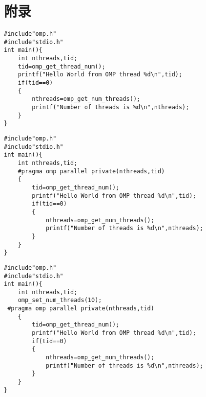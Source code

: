 \documentclass{article}
\begin{document}
\section{附录}
\noindent
\begin{minipage}[t]{0.45\textwidth}
\begin{lstlisting}[style=cstyle,caption={串行Helloworld}]
#include"omp.h"
#include"stdio.h"
int main(){
    int nthreads,tid;
    tid=omp_get_thread_num();
    printf("Hello World from OMP thread %d\n",tid);
    if(tid==0)
    {
        nthreads=omp_get_num_threads();
        printf("Number of threads is %d\n",nthreads);
    }
}
    \end{lstlisting}
\end{minipage}
\hfill 
\begin{minipage}[t]{0.45\textwidth}
    \begin{lstlisting}[style=cstyle,caption={不设线程并行Helloworld}]
#include"omp.h"
#include"stdio.h"
int main(){
    int nthreads,tid;
    #pragma omp parallel private(nthreads,tid)
    {
        tid=omp_get_thread_num();
        printf("Hello World from OMP thread %d\n",tid);
        if(tid==0)
        {
            nthreads=omp_get_num_threads();
            printf("Number of threads is %d\n",nthreads);
        }
    }
}
    \end{lstlisting}
\end{minipage}
\begin{lstlisting}[style=cstyle,caption={设置10个线程并行Helloworld}]
#include"omp.h"
#include"stdio.h"
int main(){
    int nthreads,tid;
    omp_set_num_threads(10);
 #pragma omp parallel private(nthreads,tid)
    {
        tid=omp_get_thread_num();
        printf("Hello World from OMP thread %d\n",tid);
        if(tid==0)
        {
            nthreads=omp_get_num_threads();
            printf("Number of threads is %d\n",nthreads);
        }
    }
}
\end{lstlisting}
\end{document}
